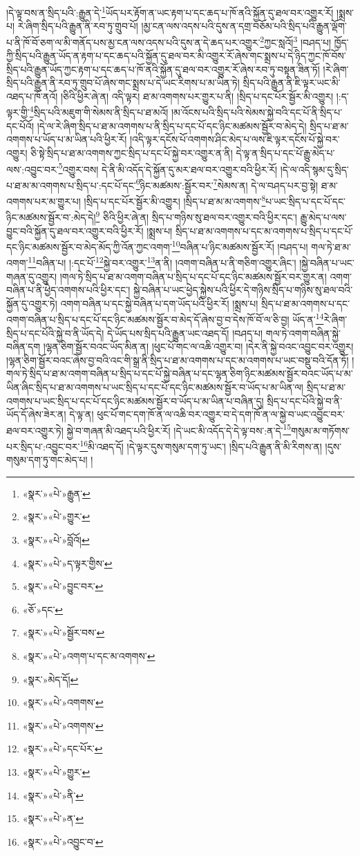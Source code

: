 །དེ་ལྟ་བས་ན་སྲིད་པའི་:རྒྱུན་དེ་\footnote{«སྣར་»«པེ་»རྒྱུན་}ཡོད་པར་རྟོག་ན་ཡང་རྟག་པ་དང་ཆད་པ་ཁོ་ནའི་སྐྱོན་དུ་ཐལ་བར་འགྱུར་རོ། །སྨྲས་པ། རེ་ཞིག་སྲིད་པའི་རྒྱུན་ནི་རབ་ཏུ་གྲུབ་པོ། །མྱ་ངན་ལས་འདས་པའི་དུས་ན་དགྲ་བཅོམ་པའི་སྲིད་པའི་རྒྱུན་ལྡོག་པ་ནི་ཁོ་བོ་ཅག་ལ་མི་གནོད་པས་མྱ་ངན་ལས་འདས་པའི་དུས་ན་དེ་ཆད་པར་འགྱུར་\footnote{«སྣར་»«པེ་»གྱུར་}ཀྱང་སླའོ།\footnote{«སྣར་»«པེ་»བློའོ།} །བཤད་པ། ཁྱོད་ཀྱི་སྲིད་པའི་རྒྱུན་ཡོད་ན་རྟག་པ་དང་ཆད་པའི་སྐྱོན་དུ་ཐལ་བར་མི་འགྱུར་རོ་ཞེས་གང་སྨྲས་པ་དེ་ཉིད་ཀྱང་ཁོ་བོས་སྲིད་པའི་རྒྱུན་ཡོད་ཀྱང་རྟག་པ་དང་ཆད་པ་ཁོ་ནའི་སྐྱོན་དུ་ཐལ་བར་འགྱུར་རོ་ཞེས་རབ་ཏུ་བསྟན་ཟིན་ཏོ། །རེ་ཞིག་སྲིད་པའི་རྒྱུན་ནི་རབ་ཏུ་གྲུབ་པོ་ཞེས་གང་སྨྲས་པ་དེ་ཡང་རིགས་པ་མ་ཡིན་ཏེ། སྲིད་པའི་རྒྱུན་ནི་ཇི་ལྟར་ཡང་མི་འཐད་པ་ཁོ་ནའོ། །ཅིའི་ཕྱིར་ཞེ་ན། འདི་ལྟར། ཐ་མ་འགགས་པར་གྱུར་པ་ནི། །སྲིད་པ་དང་པོར་སྦྱོར་མི་འགྱུར། །:ད་ལྟར་གྱི་\footnote{«སྣར་»«པེ་»ད་ལྟར་གྱིས་}སྲིད་པའི་མཇུག་གི་སེམས་ནི་སྲིད་པ་ཐ་མའོ། །མ་འོངས་པའི་སྲིད་པའི་སེམས་སྐྱེ་བའི་དང་པོ་ནི་སྲིད་པ་དང་པོའོ། །དེ་ལ་རེ་ཞིག་སྲིད་པ་ཐ་མ་འགགས་པ་ནི་སྲིད་པ་དང་པོ་དང་ཉིང་མཚམས་སྦྱོར་བ་མེད་དེ། སྲིད་པ་ཐ་མ་འགགས་པ་ཡོད་པ་མ་ཡིན་པའི་ཕྱིར་རོ། །འདི་ལྟར་དངོས་པོ་འགགས་ཤིང་མེད་པ་ལས་ཇི་ལྟར་དངོས་པོ་སྐྱེ་བར་འགྱུར། ཅི་སྟེ་སྲིད་པ་ཐ་མ་འགགས་ཀྱང་སྲིད་པ་དང་པོ་སྐྱེ་བར་འགྱུར་ན་ནི། དེ་ལྟ་ན་སྲིད་པ་དང་པོ་རྒྱུ་མེད་པ་ལས་:འབྱུང་བར་\footnote{«སྣར་»«པེ་»བྱུང་བར་}འགྱུར་བས། དེ་ནི་མི་འདོད་དེ་སྐྱོན་དུ་མར་ཐལ་བར་འགྱུར་བའི་ཕྱིར་རོ། །དེ་ལ་འདི་སྙམ་དུ་སྲིད་པ་ཐ་མ་མ་འགགས་པ་སྲིད་པ་:དང་པོ་དང་\footnote{«ཅོ་»དང་}ཉིང་མཚམས་:སྦྱོར་བར་\footnote{«སྣར་»«པེ་»སྦྱོར་བས་}སེམས་ན། དེ་ལ་བཤད་པར་བྱ་སྟེ། ཐ་མ་འགགས་པར་མ་གྱུར་པ། །སྲིད་པ་དང་པོར་སྦྱོར་མི་འགྱུར། །སྲིད་པ་ཐ་མ་མ་འགགས་\footnote{«སྣར་»«པེ་»འགག་པ་དང་མ་འགགས་}པ་ཡང་སྲིད་པ་དང་པོ་དང་ཉིང་མཚམས་སྦྱོར་བ་:མེད་དེ།\footnote{«སྣར་»མེད་དོ།} ཅིའི་ཕྱིར་ཞེ་ན། སྲིད་པ་གཉིས་སུ་ཐལ་བར་འགྱུར་བའི་ཕྱིར་དང་། རྒྱུ་མེད་པ་ལས་བྱུང་བའི་སྐྱོན་དུ་ཐལ་བར་འགྱུར་བའི་ཕྱིར་རོ། །སྨྲས་པ། སྲིད་པ་ཐ་མ་འགགས་པ་དང་མ་འགགས་པ་སྲིད་པ་དང་པོ་དང་ཉིང་མཚམས་སྦྱོར་བ་མེད་མོད་ཀྱི་འོན་ཀྱང་འགག་\footnote{«སྣར་»«པེ་»འགགས་}བཞིན་པ་ཉིང་མཚམས་སྦྱོར་རོ། །བཤད་པ། གལ་ཏེ་ཐ་མ་འགག་\footnote{«སྣར་»«པེ་»འགགས་}བཞིན་པ། །:དང་པོ་\footnote{«སྣར་»«པེ་»དང་པོར་}སྐྱེ་བར་འགྱུར་\footnote{«སྣར་»«པེ་»གྱུར་}ན་ནི། །འགག་བཞིན་པ་ནི་གཅིག་འགྱུར་ཞིང་། །སྐྱེ་བཞིན་པ་ཡང་གཞན་དུ་འགྱུར། །གལ་ཏེ་སྲིད་པ་ཐ་མ་འགག་བཞིན་པ་སྲིད་པ་དང་པོ་དང་ཉིང་མཚམས་སྦྱོར་བར་གྱུར་ན། འགག་བཞིན་པ་ནི་ཕྱེད་འགགས་པའི་ཕྱིར་དང་། སྐྱེ་བཞིན་པ་ཡང་ཕྱེད་སྐྱེས་པའི་ཕྱིར་དེ་གཉིས་སྲིད་པ་གཉིས་སུ་ཐལ་བའི་སྐྱོན་དུ་འགྱུར་ཏེ། འགག་བཞིན་པ་དང་སྐྱེ་བཞིན་པ་དག་ཡོད་པའི་ཕྱིར་རོ། །སྨྲས་པ། སྲིད་པ་ཐ་མ་འགགས་པ་དང་འགག་བཞིན་པ་སྲིད་པ་དང་པོ་དང་ཉིང་མཚམས་སྦྱོར་བ་མེད་དོ་ཞེས་བྱ་བ་དེས་ཁོ་བོ་ལ་ཅི་བྱ། ཡོད་ན་\footnote{«སྣར་»«པེ་»ནི་}རེ་ཞིག་སྲིད་པ་དང་པོའི་སྐྱེ་བ་ནི་ཡོད་དེ། དེ་ཡོད་པས་སྲིད་པའི་རྒྱུན་ཡང་འཐད་དོ། །བཤད་པ། གལ་ཏེ་འགག་བཞིན་སྐྱེ་བཞིན་དག །ལྷན་ཅིག་སྦྱོར་བའང་ཡོད་མིན་ན། །ཕུང་པོ་གང་ལ་འཆི་འགྱུར་བ། །དེར་ནི་སྐྱེ་བའང་འབྱུང་བར་འགྱུར། །ལྷན་ཅིག་སྦྱོར་བའང་ཞེས་བྱ་བའི་འང་གི་སྒྲ་ནི་སྲིད་པ་ཐ་མ་འགགས་པ་དང་མ་འགགས་པ་ཡང་བསྡུ་བའི་དོན་ཏོ། །གལ་ཏེ་སྲིད་པ་ཐ་མ་འགག་བཞིན་པ་སྲིད་པ་དང་པོ་སྐྱེ་བཞིན་པ་དང་ལྷན་ཅིག་ཉིང་མཚམས་སྦྱོར་བའང་ཡོད་པ་མ་ཡིན་ཞིང་སྲིད་པ་ཐ་མ་འགགས་པ་ཡང་སྲིད་པ་དང་པོ་དང་ཉིང་མཚམས་སྦྱོར་བ་ཡོད་པ་མ་ཡིན་ལ། སྲིད་པ་ཐ་མ་འགགས་པ་ཡང་སྲིད་པ་དང་པོ་དང་ཉིང་མཚམས་སྦྱོར་བ་ཡོད་པ་མ་ཡིན་པ་བཞིན་དུ། སྲིད་པ་དང་པོའི་སྐྱེ་བ་ནི་ཡོད་དོ་ཞེས་ཟེར་ན། དེ་ལྟ་ན། ཕུང་པོ་གང་དག་ཁོ་ན་ལ་འཆི་བར་འགྱུར་བ་དེ་དག་ཁོ་ན་ལ་སྐྱེ་བ་ཡང་འབྱུང་བར་ཐལ་བར་འགྱུར་ཏེ། སྐྱེ་བ་གཞན་མི་འཐད་པའི་ཕྱིར་རོ། །དེ་ཡང་མི་འདོད་དེ་དེ་ལྟ་བས་:ན་དེ་\footnote{«སྣར་»«པེ་»ན་}གསུམ་མ་གཏོགས་པར་སྲིད་པ་:འབྱུང་བར་\footnote{«སྣར་»«པེ་»འབྱུང་བ་}མི་འཐད་དོ། །དེ་ལྟར་དུས་གསུམ་དག་ཏུ་ཡང་། །སྲིད་པའི་རྒྱུན་ནི་མི་རིགས་ན། །དུས་གསུམ་དག་ཏུ་གང་མེད་པ། །
